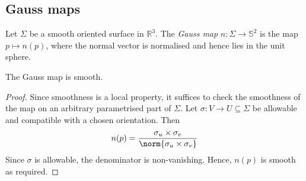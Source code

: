 \subsection{Gauss maps}
\begin{definition}
	Let $\Sigma$ be a smooth oriented surface in $\mathbb R^3$.
	The \textit{Gauss map} $n \colon \Sigma \to \mathbb S^2$ is the map $p \mapsto n(p)$, where the normal vector is normalised and hence lies in the unit sphere.
\end{definition}
\begin{lemma}
	The Gauss map is smooth.
\end{lemma}
\begin{proof}
	Since smoothness is a local property, it suffices to check the smoothness of the map on an arbitrary parametrised part of $\Sigma$.
	Let $\sigma \colon V \to U \subseteq \Sigma$ be allowable and compatible with a chosen orientation.
	Then
	\begin{align*}
		n(p) = \frac{\sigma_u \times \sigma_v}{\norm{\sigma_u \times \sigma_v}}
	\end{align*}
	Since $\sigma$ is allowable, the denominator is non-vanishing.
	Hence, $n(p)$ is smooth as required.
\end{proof}
